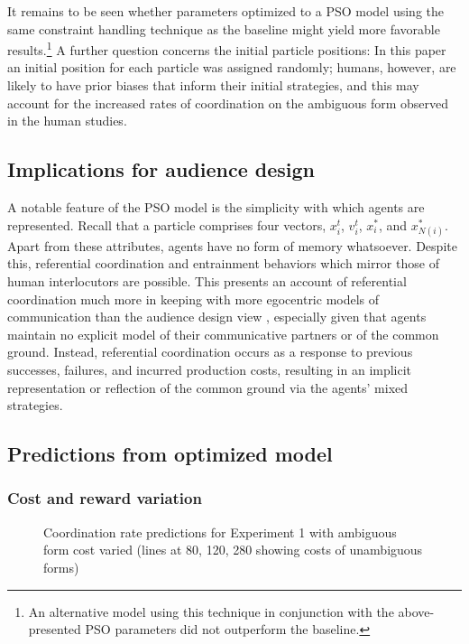 \documentclass[a4paper,11pt]{article}
\begin{document}
It remains to be seen whether parameters optimized to a PSO model using the same constraint handling technique as the baseline might yield more favorable results.\footnote{An alternative model using this technique in conjunction with the above-presented PSO parameters did not outperform the baseline.} A further question concerns the initial particle positions: In this paper an initial position for each particle was assigned randomly; humans, however, are likely to have prior biases that inform their initial strategies, and this may account for the increased rates of coordination on the ambiguous form observed in the human studies.

\subsection{Implications for audience design}
A notable feature of the PSO model is the simplicity with which agents are represented. Recall that a particle comprises four vectors, $x_i^t$, $v_i^t$, $x_i^*$, and $x_{N(i)}^*$. Apart from these attributes, agents have no form of memory whatsoever. Despite this, referential coordination and entrainment behaviors which mirror those of human interlocutors are possible. This presents an account of referential coordination much more in keeping with more egocentric models of communication \cite{horton1996} than the audience design view \cite{clark1982}, especially given that agents maintain no explicit model of their communicative partners or of the common ground. Instead, referential coordination occurs as a response to previous successes, failures, and incurred production costs, resulting in an implicit representation or reflection of the common ground via the agents' mixed strategies. 


\subsection{Predictions from optimized model}
\subsubsection{Cost and reward variation}

\begin{figure}[t]
\centering
\scalebox{.425}{}
\caption{Coordination rate predictions for Experiment 1 with ambiguous form cost varied (lines at 80, 120, 280 showing costs of unambiguous forms)}
\label{fig:3}
\end{figure}
\end{document}
